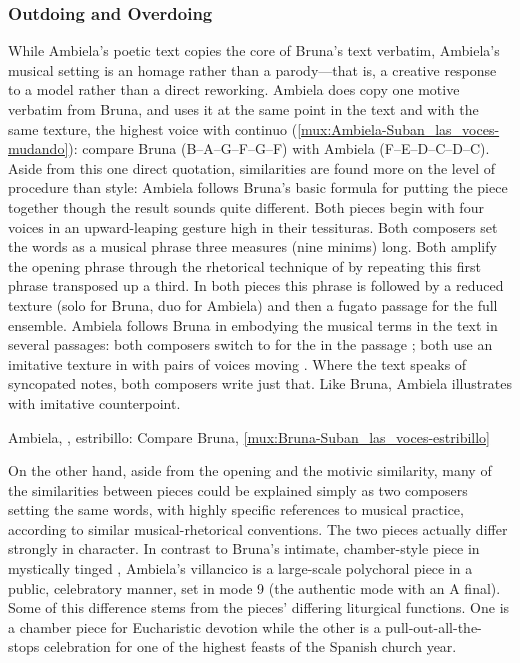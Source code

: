 \subsubsection{Outdoing and Overdoing}

While Ambiela's poetic text copies the core of Bruna's text verbatim, Ambiela's
musical setting is an homage rather than a parody---that is, a creative
response to a model rather than a direct reworking.
Ambiela does copy one motive verbatim from Bruna, and uses it at the same point
in the text and with the same texture, the highest voice with continuo
(\cref{mux:Ambiela-Suban_las_voces-mudando}): compare Bruna 
(B\fl--A--G--F\sh--G--F\sh) with Ambiela  (F--E--D--C\sh--D--C\sh).
Aside from this one direct quotation, similarities are found more on the level
of procedure than style: Ambiela follows Bruna's basic formula for putting the
piece together though the result sounds quite different.
Both pieces begin with four voices in an upward-leaping gesture high in their
tessituras.  
Both composers set the words  as a musical
phrase three measures (nine minims) long.
Both amplify the opening phrase through the rhetorical technique of
 by repeating this first phrase transposed up a third. 
In both pieces this phrase is followed by a reduced texture (solo for Bruna,
duo for Ambiela) and then a fugato passage for the full ensemble.
Ambiela follows Bruna in embodying the musical terms in the text in several
passages: both composers switch to \meterC{} for the  in the
passage ; both use an imitative texture in
 with pairs of voices moving .
Where the text speaks of syncopated notes, both composers write just that.
Like Bruna, Ambiela illustrates  with imitative counterpoint.

{Ambiela, , estribillo: Compare Bruna,
\cref{mux:Bruna-Suban_las_voces-estribillo}}

On the other hand, aside from the opening and the motivic similarity, many of
the similarities between pieces could be explained simply as two composers
setting the same words, with highly specific references to musical practice,
according to similar musical-rhetorical conventions.
The two pieces actually differ strongly in character.
In contrast to Bruna's intimate, chamber-style piece in mystically tinged
, Ambiela's villancico is a large-scale polychoral piece in
a public, celebratory manner, set in mode 9 (the authentic mode with an A
final).
Some of this difference stems from the pieces' differing liturgical functions. 
One is a chamber piece for Eucharistic devotion while the other is a
pull-out-all-the-stops celebration for one of the highest feasts of the Spanish
church year.


